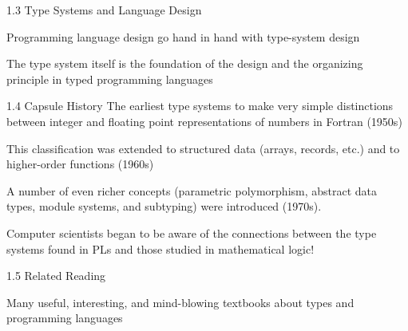 \documentclass[table]{beamer}
\begin{document}
\begin{frame}[t]{1.3 Type Systems and Language Design} \vspace{10pt}

Programming language design go hand in hand with type-system design

\vspace{10pt}

The type system itself is the foundation of the design and the organizing principle in typed programming languages

%

\end{frame}

\begin{frame}[t]{1.4 Capsule History} \vspace{10pt}
The earliest type systems to make very simple distinctions between integer and floating point representations of numbers in Fortran (1950s)

\vspace{10pt}

This classification was extended to structured data (arrays, records, etc.) and to higher-order functions (1960s)

\vspace{10pt}

A number of even richer concepts (parametric polymorphism, abstract data types, module systems, and subtyping) were introduced (1970s).

\vspace{10pt}

Computer scientists began to be aware of the connections between the type systems found in PLs and those studied in mathematical logic! 

\end{frame}

\begin{frame}[t]{1.5 Related Reading} \vspace{10pt}

Many useful, interesting, and mind-blowing textbooks about types and programming languages 

\end{frame}
\end{document}
